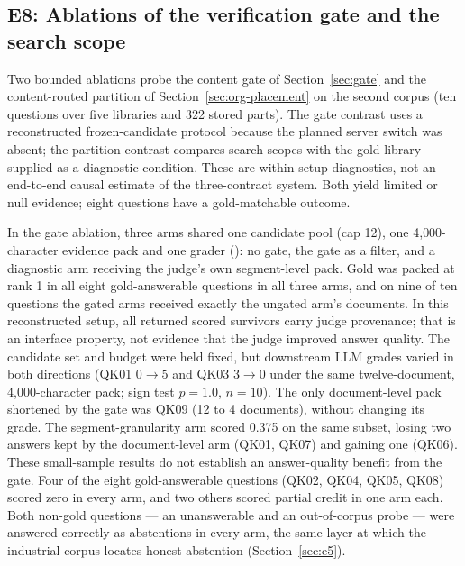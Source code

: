 \subsection{E8: Ablations of the verification gate and the search scope}
\label{sec:e8}

Two bounded ablations probe the content gate of Section~\ref{sec:gate} and
the content-routed partition of Section~\ref{sec:org-placement} on the second
corpus (ten questions over five libraries and 322 stored parts). The gate
contrast uses a reconstructed frozen-candidate protocol because the planned
server switch was absent; the partition contrast compares search scopes with
the gold library supplied as a diagnostic condition. These are within-setup
diagnostics, not an end-to-end causal estimate of the three-contract system.
Both yield limited or null evidence; eight questions have a gold-matchable
outcome.

In the gate ablation, three arms shared one candidate pool (cap 12), one
4{,}000-character evidence pack and one grader
(): no gate,
the gate as a filter, and a diagnostic arm receiving the judge's own
segment-level pack. Gold was packed at rank 1 in all eight
gold-answerable questions in all three arms, and on nine of ten questions
the gated arms received exactly the ungated arm's documents.
In this reconstructed setup, all returned scored survivors carry judge
provenance; that is an interface property, not evidence that the judge improved
answer quality. The candidate set and budget were held fixed, but downstream
LLM grades varied in both directions (QK01
$0\to5$ and QK03 $3\to0$ under the same twelve-document, 4{,}000-character
pack; sign test $p=1.0$, $n=10$). The only document-level pack shortened by
the gate was QK09 (12 to 4 documents), without changing its grade. The
segment-granularity arm scored 0.375 on the same subset, losing two answers
kept by the document-level arm (QK01, QK07) and gaining one (QK06). These
small-sample results do not establish an answer-quality benefit from the gate. Four of the eight gold-answerable questions (QK02,
QK04, QK05, QK08) scored zero in every arm, and two others scored partial
credit in one arm each. Both
non-gold questions --- an unanswerable and an out-of-corpus probe --- were
answered correctly as abstentions in every arm, the same layer at which the
industrial corpus locates honest abstention (Section~\ref{sec:e5}).

